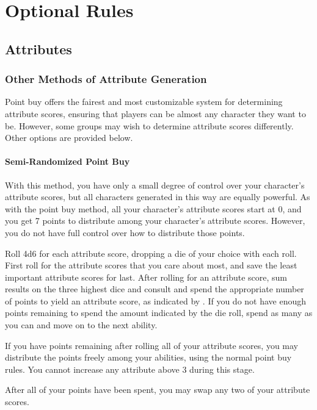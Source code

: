 \chapter{Optional Rules}

\section{Attributes}

    \subsection{Other Methods of Attribute Generation}
        Point buy offers the fairest and most customizable system for determining attribute scores, ensuring that players can be almost any character they want to be. However, some groups may wish to determine attribute scores differently. Other options are provided below.

        \subsubsection{Semi-Randomized Point Buy}
            With this method, you have only a small degree of control over your character's attribute scores, but all characters generated in this way are equally powerful. As with the point buy method, all your character's attribute scores start at 0, and you get 7 points to distribute among your character's attribute scores. However, you do not have full control over how to distribute those points.

            Roll 4d6 for each attribute score, dropping a die of your choice with each roll. First roll for the attribute scores that you care about most, and save the least important attribute scores for last. After rolling for an attribute score, sum results on the three highest dice and consult  and spend the appropriate number of points to yield an attribute score, as indicated by . If you do not have enough points remaining to spend the amount indicated by the die roll, spend as many as you can and move on to the next ability.

            If you have points remaining after rolling all of your attribute scores, you may distribute the points freely among your abilities, using the normal point buy rules. You cannot increase any attribute above 3 during this stage.

            After all of your points have been spent, you may swap any two of your attribute scores.

